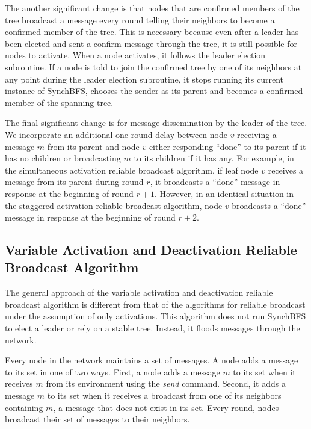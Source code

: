 \documentclass[english]{article}
\begin{document}
The another significant change is that nodes that are confirmed members of the tree broadcast a message every round telling their neighbors to become a confirmed member of the tree. This is necessary because even after a leader has been elected and sent a confirm message through the tree, it is still possible for nodes to activate. When a node activates, it follows the leader election subroutine. If a node is told to join the confirmed tree by one of its neighbors at any point during the leader election subroutine, it stops running its current instance of SynchBFS, chooses the sender as its parent and becomes a confirmed member of the spanning tree.

The final significant change is for message dissemination by the leader of the tree. We incorporate an additional one round delay between node $v$ receiving a message $m$ from its parent and node $v$ either responding ``done'' to its parent if it has no children or broadcasting $m$ to its children if it has any. For example, in the simultaneous activation reliable broadcast algorithm, if leaf node $v$ receives a message from its parent during round $r$, it broadcasts a ``done'' message in response at the beginning of round $r+1$. However, in an identical situation in the staggered activation reliable broadcast algorithm, node $v$ broadcasts a ``done'' message in response at the beginning of round $r+2$.


  \subsection {Variable Activation and Deactivation Reliable Broadcast Algorithm}

The general approach of the variable activation and deactivation reliable broadcast algorithm is different from that of the algorithms for reliable broadcast under the assumption of only activations. This algorithm does not run SynchBFS to elect a leader or rely on a stable tree. Instead, it floods messages through the network.

Every node in the network maintains a set of messages. A node adds a message to its set in one of two ways. First, a node adds a message $m$ to its set when it receives $m$ from its environment using the \textit{send} command. Second, it adds a message $m$ to its set when it receives a broadcast from one of its neighbors containing $m$, a message that does not exist in its set. Every round, nodes broadcast their set of messages to their neighbors. 
\end{document}
